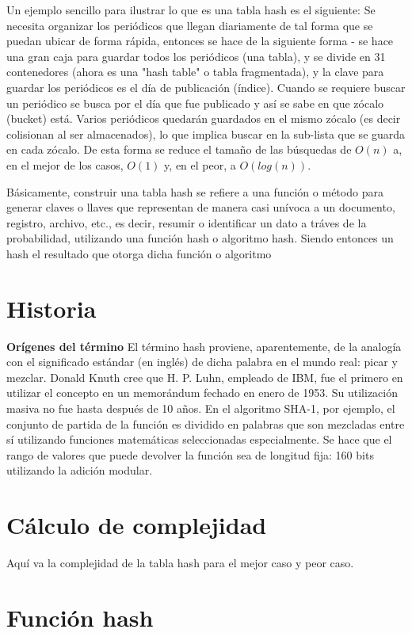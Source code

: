 \documentclass[letterpaper,openright,12pt]{report}
\begin{document}
Un ejemplo sencillo para ilustrar lo que es una tabla hash es el siguiente: Se necesita organizar los periódicos que llegan diariamente de tal forma que se puedan ubicar de forma rápida, entonces se hace de la siguiente forma - se hace una gran caja para guardar todos los periódicos (una tabla), y se divide en 31 contenedores (ahora es una "hash table" o tabla fragmentada), y la clave para guardar los periódicos es el día de publicación (índice). Cuando se requiere buscar un periódico se busca por el día que fue publicado y así se sabe en que zócalo (bucket) está. Varios periódicos quedarán guardados en el mismo zócalo (es decir colisionan al ser almacenados), lo que implica buscar en la sub-lista que se guarda en cada zócalo. De esta forma se reduce el tamaño de las búsquedas de $O(n)$ a, en el mejor de los casos, $O(1)$ y, en el peor, a $O(log(n))$.

Básicamente, construir una tabla hash se refiere a una función o método para generar claves o llaves que representan de manera casi unívoca a un documento, registro, archivo, etc., es decir, resumir o identificar un dato a tráves de la probabilidad, utilizando una función hash o algoritmo hash. Siendo entonces un hash el resultado que otorga dicha función o algoritmo%

\newpage
\section{Historia}

\textbf{Orígenes del término} El término hash proviene, aparentemente,
de la analogía con el significado estándar (en inglés) de dicha palabra
en el mundo real: picar y mezclar. Donald Knuth cree que H. P. Luhn,
empleado de IBM, fue el primero en utilizar el concepto en un memorándum
fechado en enero de 1953. Su utilización masiva no fue hasta después de
10 años. En el algoritmo SHA-1, por ejemplo, el conjunto de partida de
la función es dividido en palabras que son mezcladas entre sí utilizando
funciones matemáticas seleccionadas especialmente. Se hace que el rango
de valores que puede devolver la función sea de longitud fija: 160 bits
utilizando la adición modular.
\newpage
\section{Cálculo de complejidad}
Aquí va la complejidad de la tabla hash para el mejor caso y peor caso.
\newpage

\section{Función hash}
\end{document}
